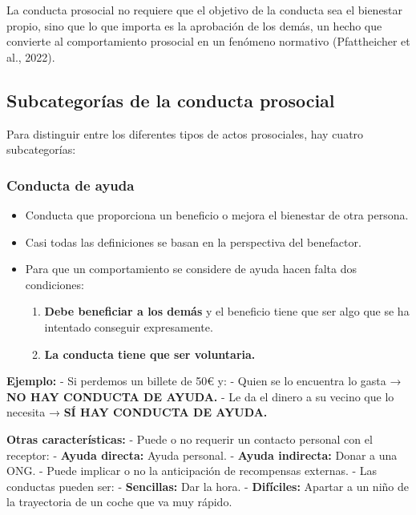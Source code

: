 \documentclass[
]{book}
\providecommand{\tightlist}{%
  \setlength{\itemsep}{0pt}\setlength{\parskip}{0pt}}
\begin{document}
La conducta prosocial no requiere que el objetivo de la conducta sea el bienestar propio, sino que lo que importa es la aprobación de los demás, un hecho que convierte al comportamiento prosocial en un fenómeno normativo (Pfattheicher et al., 2022).

\subsection{Subcategorías de la conducta prosocial}\label{subcategoruxedas-de-la-conducta-prosocial}

Para distinguir entre los diferentes tipos de actos prosociales, hay cuatro subcategorías:

\subsubsection{Conducta de ayuda}\label{conducta-de-ayuda}

\begin{itemize}
\tightlist
\item
  Conducta que proporciona un beneficio o mejora el bienestar de otra persona.
\item
  Casi todas las definiciones se basan en la perspectiva del benefactor.
\item
  Para que un comportamiento se considere de ayuda hacen falta dos condiciones:

  \begin{enumerate}
  \def\labelenumi{\arabic{enumi}.}
  \tightlist
  \item
    \textbf{Debe beneficiar a los demás} y el beneficio tiene que ser algo que se ha intentado conseguir expresamente.
  \item
    \textbf{La conducta tiene que ser voluntaria.}
  \end{enumerate}
\end{itemize}

\textbf{Ejemplo:}
- Si perdemos un billete de 50€ y:
- Quien se lo encuentra lo gasta → \textbf{NO HAY CONDUCTA DE AYUDA.}
- Le da el dinero a su vecino que lo necesita → \textbf{SÍ HAY CONDUCTA DE AYUDA.}

\textbf{Otras características:}
- Puede o no requerir un contacto personal con el receptor:
- \textbf{Ayuda directa:} Ayuda personal.
- \textbf{Ayuda indirecta:} Donar a una ONG.
- Puede implicar o no la anticipación de recompensas externas.
- Las conductas pueden ser:
- \textbf{Sencillas:} Dar la hora.
- \textbf{Difíciles:} Apartar a un niño de la trayectoria de un coche que va muy rápido.
\end{document}
